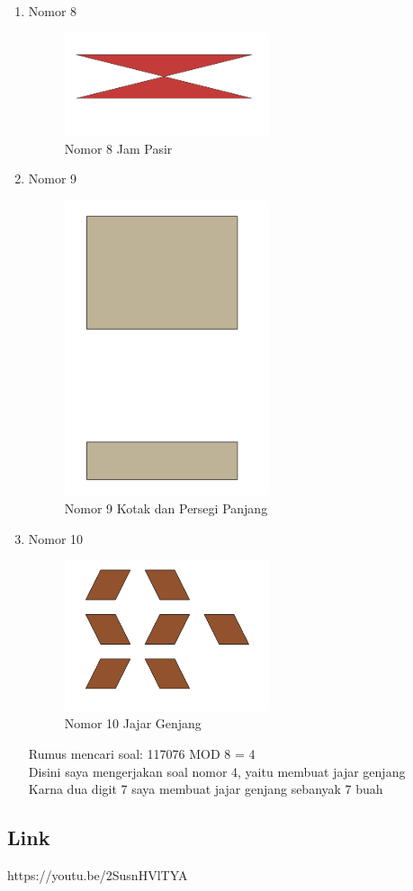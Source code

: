 \begin{enumerate}
	\item Nomor 8
	
	\begin{figure}[H]
		\includegraphics[width=6cm]{figures/Tugas2/1174076/soal8.png}
		\centering
		\caption{Nomor 8 Jam Pasir}
	\end{figure}

	\item Nomor 9
	
	\begin{figure}[H]
		\includegraphics[width=6cm]{figures/Tugas2/1174076/soal9.png}
		\centering
		\caption{Nomor 9 Kotak dan Persegi Panjang}
	\end{figure}

	\item Nomor 10
	
	\begin{figure}[H]
		\includegraphics[width=6cm]{figures/Tugas2/1174076/soal10.png}
		\centering
		\caption{Nomor 10 Jajar Genjang}
	\end{figure}
Rumus mencari soal: 117076 MOD 8 = 4\\ 
Disini saya mengerjakan soal nomor 4, yaitu membuat jajar genjang \\
Karna dua digit 7 saya membuat jajar genjang sebanyak 7 buah
\end{enumerate}

\subsection{Link}
https://youtu.be/2SusnHVlTYA